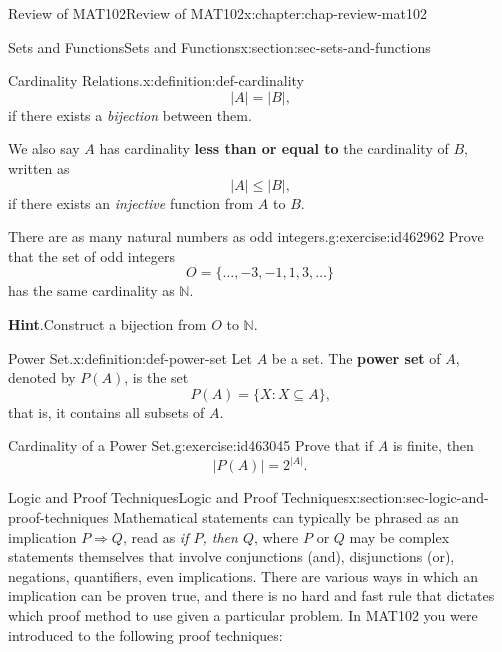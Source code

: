 \documentclass[oneside,10pt,]{book}
\newcommand{\blocktitlefont}{\relax}
\newcommand{\terminology}[1]{\textbf{#1}}
\numberwithin{equation}{section}
\begin{document}
\begin{chapterptx}{Review of MAT102}{}{Review of MAT102}{}{}{x:chapter:chap-review-mat102}
\begin{sectionptx}{Sets and Functions}{}{Sets and Functions}{}{}{x:section:sec-sets-and-functions}
\begin{definition}{Cardinality Relations.}{x:definition:def-cardinality}
\begin{equation*}
|A| = |B|\text{,}
\end{equation*}
if there exists a \emph{bijection} between them.%
\par
We also say \(A\) has cardinality \terminology{less than or equal to} the cardinality of \(B\), written as%
\begin{equation*}
|A| \leq |B|\text{,}
\end{equation*}
if there exists an \emph{injective} function from \(A\) to \(B\).%
\end{definition}
\begin{inlineexercise}{There are as many natural numbers as odd integers.}{g:exercise:id462962}%
Prove that the set of odd integers%
\begin{equation*}
O = \{\ldots,-3,-1,1,3,\ldots\}
\end{equation*}
has the same cardinality as \(\mathbb{N}\).%
\par\smallskip%
\noindent\textbf{\blocktitlefont Hint}.\hypertarget{g:hint:id463017}{}\quad{}Construct a bijection from \(O\) to \(\mathbb{N}\).%
\end{inlineexercise}
\begin{definition}{Power Set.}{x:definition:def-power-set}%
\label{g:notation:id463028} Let \(A\) be a set. The \terminology{power set} of \(A\), denoted by \(P(A)\), is the set%
\begin{equation*}
P(A) = \{X : X \subseteq A\}\text{,}
\end{equation*}
that is, it contains all subsets of \(A\).%
\end{definition}
\begin{inlineexercise}{Cardinality of a Power Set.}{g:exercise:id463045}%
Prove that if \(A\) is finite, then%
\begin{equation*}
|P(A)| = 2^{|A|}\text{.}
\end{equation*}
%
\end{inlineexercise}
\end{sectionptx}
%
%
\typeout{************************************************}
\typeout{************************************************}
%
\begin{sectionptx}{Logic and Proof Techniques}{}{Logic and Proof Techniques}{}{}{x:section:sec-logic-and-proof-techniques}
Mathematical statements can typically be phrased as an implication \(P \Rightarrow Q\),  read as \emph{if \(P\), then \(Q\)}, where \(P\) or \(Q\) may be complex statements themselves that involve conjunctions (and), disjunctions (or), negations, quantifiers, even implications. There are various ways in which an implication can be proven true, and there is no hard and fast rule that dictates which proof method to use given a particular problem. In MAT102 you were introduced to the following proof techniques:%

\end{sectionptx}
\end{chapterptx}
\end{document}
